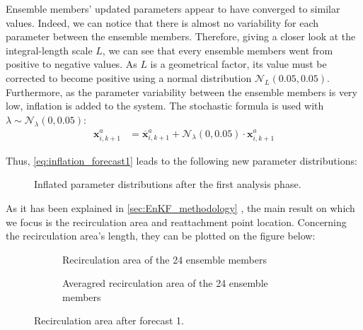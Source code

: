 \documentclass[12pt,twoside]{report}
\newcommand{\Autoref}[1]{%
  \begingroup%
    \def\chapterautorefname{Chapter}%
    \def\sectionautorefname{Section}%
    \def\subsectionautorefname{Subsection}%
    \def\subsubsectionautorefname{Subsubsection}%
    \def\paragraphautorefname{Paragraph}%
    \def\tableautorefname{Table}%
    \def\equationautorefname{Equation}%
    \def\algorithmautorefname{Algorithm}%
    \def\lineautorefname{Step}%
  \autoref{#1}%
  \endgroup%
}
\begin{document}
Ensemble members' updated parameters appear to have converged to similar values. Indeed, we can notice that there is almost no variability for each parameter between the ensemble members. Therefore, giving a closer look at the integral-length scale $L$, we can see that every ensemble members went from positive to negative values. As $L$ is a geometrical factor, its value must be corrected to become positive using a normal distribution $\mathcal{N}_L\left( 0.05,0.05\right)$. \\

Furthermore, as the parameter variability between the ensemble members is very low, inflation is added to the system. The stochastic formula is used with $\lambda \sim \mathcal{N}_{\lambda}\left( 0, 0.05 \right)$:
\begin{align}
    \mathbf{x}_{i,k+1}^a &= \overline{\mathbf{x}}_{i,k+1}^a + \mathcal{N}_{\lambda}\left( 0, 0.05 \right) \cdot \mathbf{x}_{i,k+1}^a \label{eq:inflation_forecast1}
\end{align}

\clearpage

Thus, \autoref{eq:inflation_forecast1} leads to the following new parameter distributions:
\begin{figure}[h!]
    \centering
    
    \caption{Inflated parameter distributions after the first analysis phase.}
    \label{fig:ObsSetC_Analysis1_Inflation}
\end{figure}

As it has been explained in \Autoref{sec:EnKF_methodology}, the main result on which we focus is the recirculation area and reattachment point location. Concerning the recirculation area's length, they can be plotted on the figure below:
\begin{figure}[h!]
    \begin{subfigure}[t]{.48\textwidth}
        \centering
        
        \caption{Recirculation area of the 24 ensemble members}
        \label{fig:recirculation_forecast1_24ensembles}
    \end{subfigure}
\hfill
    \begin{subfigure}[t]{.48\textwidth}
        \centering
        
        \caption{Averagred recirculation area of the 24 ensemble members}
        \label{fig:recirculation_forecast1_24ensemblesAvg}
    \end{subfigure}
    \caption{Recirculation area after forecast 1.}
    \label{fig:recirculation_Forecast1}
\end{figure}
\end{document}
